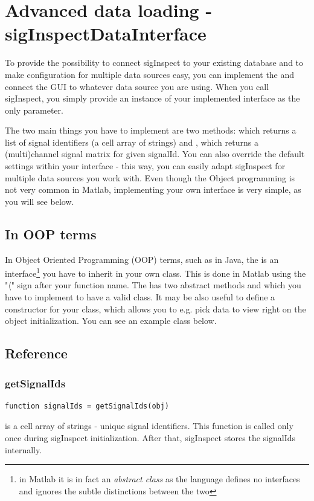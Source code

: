 \documentclass[a4paper,10pt]{article}
\begin{document}



\section{Advanced data loading - sigInspectDataInterface}
To provide the possibility to connect sigInspect to your existing database and to make configuration for multiple data sources easy, you can implement the  and connect the GUI to whatever data source you are using. When you call sigInspect, you simply provide an instance of your implemented interface as the only parameter.

The two main things you have to implement are two methods:  which returns a list of signal identifiers (a cell array of strings) and , which returns a (multi)channel signal matrix for given signalId. You can also override the default settings within your interface - this way, you can easily adapt sigInspect for multiple data sources you work with. Even though the Object programming is not very common in Matlab, implementing your own interface is very simple, as you will see below.

\subsection{In OOP terms}
In Object Oriented Programming (OOP) terms, such as in Java, the  is an interface\footnote{in Matlab it is in fact an \emph{abstract class} as the language defines no interfaces and ignores the subtle distinctions between the two} you have to inherit in your own class. This is done in Matlab using the "$\langle$" sign after your function name. The  has two abstract methods  and  which you have to implement to have a valid class. It may be also useful to define a constructor for your class, which allows you to e.g. pick data to view right on the object initialization. You can see an example class below.

\subsection{Reference}
\subsubsection{getSignalIds}
\begin{lstlisting}
function signalIds = getSignalIds(obj)
\end{lstlisting}
 is a cell array of strings - unique signal identifiers. This function is called only once during sigInspect initialization. After that, sigInspect stores the signalIds internally.
\end{document}
